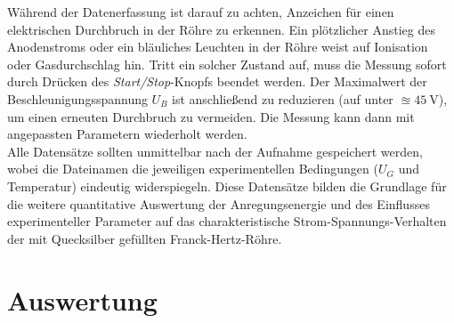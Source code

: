 Während der Datenerfassung ist darauf zu achten, Anzeichen für einen elektrischen Durchbruch in der Röhre zu erkennen. Ein plötzlicher Anstieg des Anodenstroms oder ein bläuliches Leuchten in der Röhre weist auf Ionisation oder Gasdurchschlag hin. Tritt ein solcher Zustand auf, muss die Messung sofort durch Drücken des \textit{Start/Stop}-Knopfs beendet werden. Der Maximalwert der Beschleunigungsspannung $U_B$ ist anschließend zu reduzieren (auf unter $\approxeq\SI{45}{\volt}$), um einen erneuten Durchbruch zu vermeiden. Die Messung kann dann mit angepassten Parametern wiederholt werden.
\vspace{0.3cm}\\
Alle Datensätze sollten unmittelbar nach der Aufnahme gespeichert werden, wobei die Dateinamen die jeweiligen experimentellen Bedingungen ($U_G$ und Temperatur) eindeutig widerspiegeln. Diese Datensätze bilden die Grundlage für die weitere quantitative Auswertung der Anregungsenergie und des Einflusses experimenteller Parameter auf das charakteristische Strom-Spannungs-Verhalten der mit Quecksilber gefüllten Franck-Hertz-Röhre.
\section{Auswertung}
%
